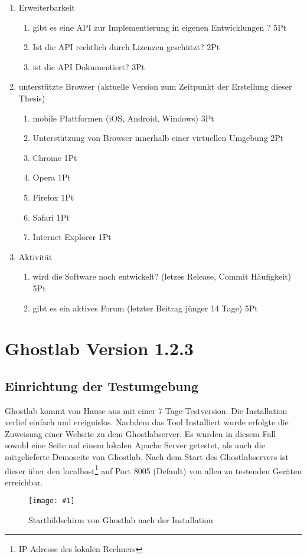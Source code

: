 \documentclass[13pt,a4paper,oneside]{scrbook} %
\newcommand{\mi}[1]{\index{#1}#1}
\renewcommand{\\}{\bigskip}
\newcommand{\ig}[3]{
\begin{figure}[htbp]
	\centering
	\texttt{[image: \#1]}%
	\caption[#2]{#3}%
\end{figure}
}
\begin{document}
\begin{enumerate}
	\item Erweiterbarkeit
	\begin{enumerate}
		\item gibt es eine API zur Implementierung in eigenen Entwicklungen ? 5Pt
		\item Ist die API rechtlich durch Lizenzen geschützt? 2Pt
		\item ist die API Dokumentiert? 3Pt
	\end{enumerate}
	
	\item unterstützte Browser (aktuelle Version zum Zeitpunkt der Erstellung dieser Thesis)
	\begin{enumerate}
		\item mobile Plattformen (iOS, Android, Windows) 3Pt
		\item Unterstützung von Browser innerhalb einer virtuellen Umgebung 2Pt
		\item Chrome 1Pt
		\item Opera 1Pt
		\item Firefox 1Pt
		\item Safari 1Pt
		\item Internet Explorer 1Pt
	\end{enumerate}
	
	\item Aktivität
	\begin{enumerate}
		\item wird die Software noch entwickelt? (letzes Release, Commit Häufigkeit) 5Pt
		\item gibt es ein aktives Forum (letzter Beitrag jünger 14 Tage) 5Pt
	\end{enumerate}

\end{enumerate}

	\pagebreak
	\section{\mi{Ghostlab} Version 1.2.3}
		\subsection {Einrichtung der Testumgebung}
		Ghostlab kommt von Hause aus mit einer 7-Tage-Testversion. Die Installation verlief einfach und ereignislos. Nachdem das 		Tool Installiert wurde erfolgte die Zuweisung einer Website zu dem Ghostlabserver. Es wurden in diesem Fall sowohl eine 		Seite auf einem lokalen Apache Server getestet, als auch die mitgelieferte Demoseite von Ghostlab. Nach dem Start des 			Ghostlabservers ist dieser über den localhost\footnote{IP-Adresse des lokalen Rechners} auf Port 8005 (Default) von allen 		zu testenden Geräten erreichbar.
		\ig{../pictures/ghostlab/startbildschirm}{Startbildschirm Ghostlab}{Startbildschirm von Ghostlab nach der Installation}
		
\end{document}

